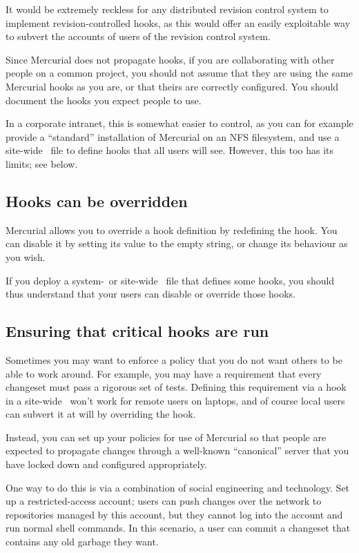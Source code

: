 It would be extremely reckless for any distributed revision control
system to implement revision-controlled hooks, as this would offer an
easily exploitable way to subvert the accounts of users of the
revision control system.

Since Mercurial does not propagate hooks, if you are collaborating
with other people on a common project, you should not assume that they
are using the same Mercurial hooks as you are, or that theirs are
correctly configured.  You should document the hooks you expect people
to use.

In a corporate intranet, this is somewhat easier to control, as you
can for example provide a ``standard'' installation of Mercurial on an
NFS filesystem, and use a site-wide \hgrc\ file to define hooks that
all users will see.  However, this too has its limits; see below.

\subsection{Hooks can be overridden}

Mercurial allows you to override a hook definition by redefining the
hook.  You can disable it by setting its value to the empty string, or
change its behaviour as you wish.

If you deploy a system-~or site-wide \hgrc\ file that defines some
hooks, you should thus understand that your users can disable or
override those hooks.

\subsection{Ensuring that critical hooks are run}

Sometimes you may want to enforce a policy that you do not want others
to be able to work around.  For example, you may have a requirement
that every changeset must pass a rigorous set of tests.  Defining this
requirement via a hook in a site-wide \hgrc\ won't work for remote
users on laptops, and of course local users can subvert it at will by
overriding the hook.

Instead, you can set up your policies for use of Mercurial so that
people are expected to propagate changes through a well-known
``canonical'' server that you have locked down and configured
appropriately.

One way to do this is via a combination of social engineering and
technology.  Set up a restricted-access account; users can push
changes over the network to repositories managed by this account, but
they cannot log into the account and run normal shell commands.  In
this scenario, a user can commit a changeset that contains any old
garbage they want.

